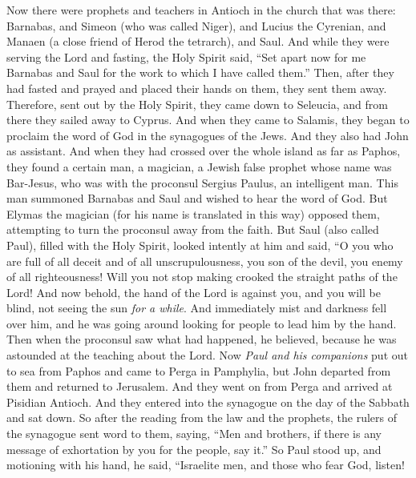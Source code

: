 \begin{biblechapter} %
 Now there were prophets and teachers in Antioch in the church that was there: Barnabas, and Simeon (who was called Niger), and Lucius the Cyrenian, and Manaen (a close friend of Herod the tetrarch), and Saul.
\verse And while they were serving the Lord and fasting, the Holy Spirit said, “Set apart now for me Barnabas and Saul for the work to which I have called them.”
\verse Then, after they had fasted and prayed and placed their hands on them, they sent them away.
 Therefore, sent out by the Holy Spirit, they came down to Seleucia, and from there they sailed away to Cyprus.
\verse And when they came to Salamis, they began to proclaim the word of God in the synagogues of the Jews. And they also had John as assistant.
\verse And when they had crossed over the whole island as far as Paphos, they found a certain man, a magician, a Jewish false prophet whose name was Bar-Jesus,
\verse who was with the proconsul Sergius Paulus, an intelligent man. This man summoned Barnabas and Saul and wished to hear the word of God.
\verse But Elymas the magician (for his name is translated in this way) opposed them, attempting to turn the proconsul away from the faith.
\verse But Saul (also called Paul), filled with the Holy Spirit, looked intently at him
\verse and said, “O you who are full of all deceit and of all unscrupulousness, you son of the devil, you enemy of all righteousness! Will you not stop making crooked the straight paths of the Lord!
\verse And now behold, the hand of the Lord is against you, and you will be blind, not seeing the sun \textit{for a while}. And immediately mist and darkness fell over him, and he was going around looking for people to lead him by the hand.
\verse Then when the proconsul saw what had happened, he believed, because he was astounded at the teaching about the Lord.
 Now \textit{Paul and his companions} put out to sea from Paphos and came to Perga in Pamphylia, but John departed from them and returned to Jerusalem.
\verse And they went on from Perga and arrived at Pisidian Antioch. And they entered into the synagogue on the day of the Sabbath and sat down.
\verse So after the reading from the law and the prophets, the rulers of the synagogue sent word to them, saying, “Men and brothers, if there is any message of exhortation by you for the people, say it.”
\verse So Paul stood up, and motioning with his hand, he said, “Israelite men, and those who fear God, listen!

\end{biblechapter}
